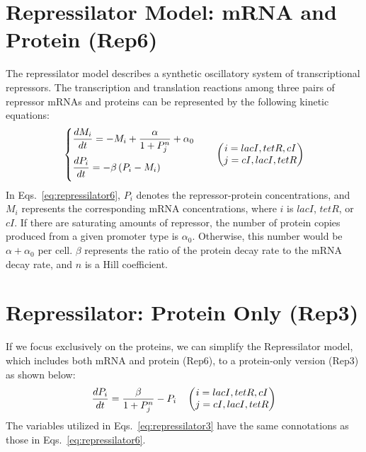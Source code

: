 

\section{Repressilator Model: mRNA and Protein (Rep6)}
\label{appendix:rep6}
The repressilator model \cite{elowitz2000synthetic} describes a synthetic oscillatory system of transcriptional repressors. 
The transcription and translation reactions among three pairs of repressor mRNAs and proteins can be represented by the following kinetic equations: 
\begin{equation}
\begin{cases}
\dfrac{dM_{i}}{dt} = - M_{i}+\dfrac{\alpha}{1+P^{n}_{j}}+\alpha_{0}\quad\vspace{1ex} \\
\dfrac{dP_{i}}{dt} = - \beta\left(P_{i}-M_{i}\right)\quad\vspace{1ex} 
\end{cases}
\begin{pmatrix} i=lacI, tetR, cI \\ j=cI, lacI, tetR \end{pmatrix}
\label{eq:repressilator6}
\end{equation}
In Eqs.~\ref{eq:repressilator6}, $P_{i}$ denotes the repressor-protein concentrations, and $M_{i}$ represents the corresponding mRNA concentrations, where $i$ is $lacI$, $tetR$, or $cI$. If there are saturating amounts of repressor, the number of protein copies produced from a given promoter type is $\alpha_{0}$. Otherwise, this number would be $\alpha+\alpha_{0}$ per cell. $\beta$ represents the ratio of the protein decay rate to the mRNA decay rate, and $n$ is a Hill coefficient.

\section{Repressilator: Protein Only (Rep3)}
\label{appendix:rep3}
If we focus exclusively on the proteins, we can simplify the Repressilator model, which includes both mRNA and protein (Rep6), to a protein-only version (Rep3) as shown below:
\begin{equation}
\dfrac{dP_{i}}{dt} = \dfrac{\beta}{1+P^{n}_{j}} - P_{i}\quad\vspace{1ex} 
\begin{pmatrix} i=lacI, tetR, cI \\ j=cI, lacI, tetR \end{pmatrix}
\label{eq:repressilator3}
\end{equation}
The variables utilized in Eqs.~\ref{eq:repressilator3} have the same connotations as those in Eqs.~\ref{eq:repressilator6}.


